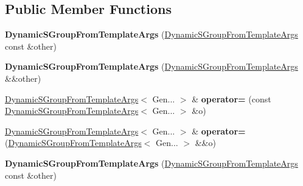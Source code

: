 \subsection*{Public Member Functions}
\begin{DoxyCompactItemize}
\item 
\mbox{\label{class_eigen_1_1_dynamic_s_group_from_template_args_a67f075a8707d47f16d4548c7bb275c0a}} 
{\bfseries Dynamic\+S\+Group\+From\+Template\+Args} (\hyperlink{class_eigen_1_1_dynamic_s_group_from_template_args}{Dynamic\+S\+Group\+From\+Template\+Args} const \&other)
\item 
\mbox{\label{class_eigen_1_1_dynamic_s_group_from_template_args_afc646c7575fcfe3c19d3700e8ce25e92}} 
{\bfseries Dynamic\+S\+Group\+From\+Template\+Args} (\hyperlink{class_eigen_1_1_dynamic_s_group_from_template_args}{Dynamic\+S\+Group\+From\+Template\+Args} \&\&other)
\item 
\mbox{\label{class_eigen_1_1_dynamic_s_group_from_template_args_aa7ce4dd875e679ac0514056a97e3d5cd}} 
\hyperlink{class_eigen_1_1_dynamic_s_group_from_template_args}{Dynamic\+S\+Group\+From\+Template\+Args}$<$ Gen... $>$ \& {\bfseries operator=} (const \hyperlink{class_eigen_1_1_dynamic_s_group_from_template_args}{Dynamic\+S\+Group\+From\+Template\+Args}$<$ Gen... $>$ \&o)
\item 
\mbox{\label{class_eigen_1_1_dynamic_s_group_from_template_args_a7e24a7db69be7147c3ebb57a4f389e39}} 
\hyperlink{class_eigen_1_1_dynamic_s_group_from_template_args}{Dynamic\+S\+Group\+From\+Template\+Args}$<$ Gen... $>$ \& {\bfseries operator=} (\hyperlink{class_eigen_1_1_dynamic_s_group_from_template_args}{Dynamic\+S\+Group\+From\+Template\+Args}$<$ Gen... $>$ \&\&o)
\item 
\mbox{\label{class_eigen_1_1_dynamic_s_group_from_template_args_a67f075a8707d47f16d4548c7bb275c0a}} 
{\bfseries Dynamic\+S\+Group\+From\+Template\+Args} (\hyperlink{class_eigen_1_1_dynamic_s_group_from_template_args}{Dynamic\+S\+Group\+From\+Template\+Args} const \&other)
\item 
\mbox{\label{class_eigen_1_1_dynamic_s_group_from_template_args_afc646c7575fcfe3c19d3700e8ce25e92}} 

\end{DoxyCompactItemize}
